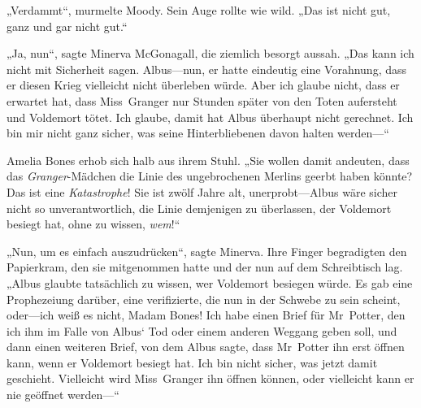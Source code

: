 „Verdammt“, murmelte Moody. Sein Auge rollte wie wild. „Das ist nicht gut, ganz und gar nicht gut.“

„Ja, nun“, sagte Minerva McGonagall, die ziemlich besorgt aussah. „Das kann ich nicht mit Sicherheit sagen. Albus—nun, er hatte eindeutig eine Vorahnung, dass er diesen Krieg vielleicht nicht überleben würde. Aber ich glaube nicht, dass er erwartet hat, dass Miss~Granger nur Stunden später von den Toten aufersteht und Voldemort tötet. Ich glaube, damit hat Albus überhaupt nicht gerechnet. Ich bin mir nicht ganz sicher, was seine Hinterbliebenen davon halten werden—“

Amelia Bones erhob sich halb aus ihrem Stuhl.
„Sie wollen damit andeuten, dass das \emph{Granger}-Mädchen die Linie des ungebrochenen Merlins geerbt haben könnte? Das ist eine \emph{Katastrophe}! Sie ist zwölf Jahre alt, unerprobt—Albus wäre sicher nicht so unverantwortlich, die Linie demjenigen zu überlassen, der Voldemort besiegt hat, ohne zu wissen, \emph{wem}!“

„Nun, um es einfach auszudrücken“, sagte Minerva.
Ihre Finger begradigten den Papierkram, den sie mitgenommen hatte und der nun auf dem Schreibtisch lag. „Albus glaubte tatsächlich zu wissen, wer Voldemort besiegen würde. Es gab eine Prophezeiung darüber, eine verifizierte, die nun in der Schwebe zu sein scheint, oder—ich weiß es nicht, Madam Bones! Ich habe einen Brief für Mr~Potter, den ich ihm im Falle von Albus‘ Tod oder einem anderen Weggang geben soll, und dann einen weiteren Brief, von dem Albus sagte, dass Mr~Potter ihn erst öffnen kann, wenn er Voldemort besiegt hat. Ich bin nicht sicher, was jetzt damit geschieht.
Vielleicht wird Miss~Granger ihn öffnen können, oder vielleicht kann er nie geöffnet werden—“

